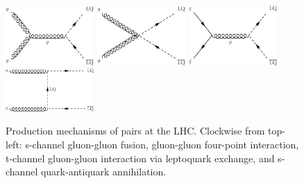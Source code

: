 \begin{figure}[H]
    \centering
    {\includegraphics[width=0.3\textwidth]{Images/Theory/LQLQProduction_1.pdf}\hspace{0.1\textwidth}}
    {\includegraphics[width=0.3\textwidth]{Images/Theory/LQLQProduction_3.pdf}\vspace{0.05\textwidth}}
    {\includegraphics[width=0.3\textwidth]{Images/Theory/LQLQProduction_2.pdf}\hspace{0.1\textwidth}}
    {\includegraphics[width=0.3\textwidth]{Images/Theory/LQLQProduction_4.pdf}\vspace{0.05\textwidth}}
    \caption{Production mechanisms of \HepProcess{\LQ\LQbar} pairs at the LHC. Clockwise from top-left: s-channel gluon-gluon fusion, gluon-gluon four-point interaction, t-channel gluon-gluon interaction via leptoquark exchange, and s-channel quark-antiquark annihilation.}
    \label{fig:LQpairprod}
\end{figure}